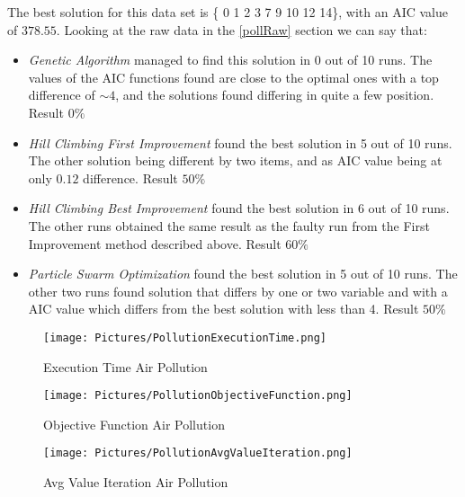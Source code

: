 The best solution for this data set is \{ 0 1 2 3 7 9 10 12 14\}, with an AIC value of $378.55$. Looking at the raw data in the \ref{pollRaw} section we can say that:
\begin{itemize}
	\item \textit{Genetic Algorithm} managed to find this solution in 0 out of 10 runs. The values of the AIC functions found are close to the optimal ones with a top difference of $\sim 4$, and the solutions found differing in quite a few position. Result $0 \%$
	\item \textit{Hill Climbing First Improvement} found the best solution in 5 out of 10 runs. The other solution being different by two items, and as AIC value being at only $0.12$ difference. Result $50 \%$
	\item \textit{Hill Climbing Best Improvement} found the best solution in 6 out of 10 runs. The other runs obtained the same result as the faulty run from the First Improvement method described above. Result $60 \%$
	\item \textit{Particle Swarm Optimization} found the best solution in 5 out of 10 runs. The other two runs found solution that differs by one or two variable and with a AIC value which differs from the best solution with less than 4. Result $50 \%$
\end{itemize}

\begin{figure}[ht]
	\texttt{[image: Pictures/PollutionExecutionTime.png]}
	\caption{ Execution Time Air Pollution}
	\label{Execution Time Air Pollution}
\end{figure}

\begin{figure}[ht]
	\texttt{[image: Pictures/PollutionObjectiveFunction.png]}
	\caption{ Objective Function Air Pollution }
	\label{Objective Function Air Pollution}
\end{figure}

\begin{figure}[ht]
	\texttt{[image: Pictures/PollutionAvgValueIteration.png]}
	\caption{ Avg Value Iteration Air Pollution }
	\label{Avg Value Iteration Air Pollution}
\end{figure}

